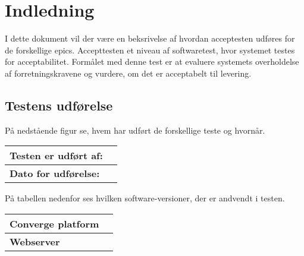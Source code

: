 \chapter{Indledning}
I dette dokument vil der være en beksrivelse af hvordan acceptesten udføres for de forskellige epics. 
Accepttesten et niveau af softwaretest, hvor systemet testes for acceptabilitet. Formålet med denne test er at evaluere systemets overholdelse af forretningskravene og vurdere, om det er acceptabelt til levering.

\section{Testens udførelse}

På nedstående figur se, hvem har udført de forskellige teste og hvornår. 

\begin{table}[H]
	\centering
	\begin{tabular}{l|L{300px}}
		\hline
		\textbf{Testen er udført af:} & \\[20px]
		\hline
		\textbf{Dato for udførelse:} & \\[20px]
		\hline
	\end{tabular}
	\label{tab:TableLabel}
\end{table}

På tabellen nedenfor ses hvilken software-versioner, der er andvendt i testen. 

\begin{table}[H]
	\centering
    \begin{tabular}{l|L{300px}}
        \hline
		\textbf{Converge platform} & \\[20px]
		\hline
		\textbf{Webserver} & \\[20px]
		\hline
	\end{tabular}
	\label{tab:TableLabel}
\end{table}

